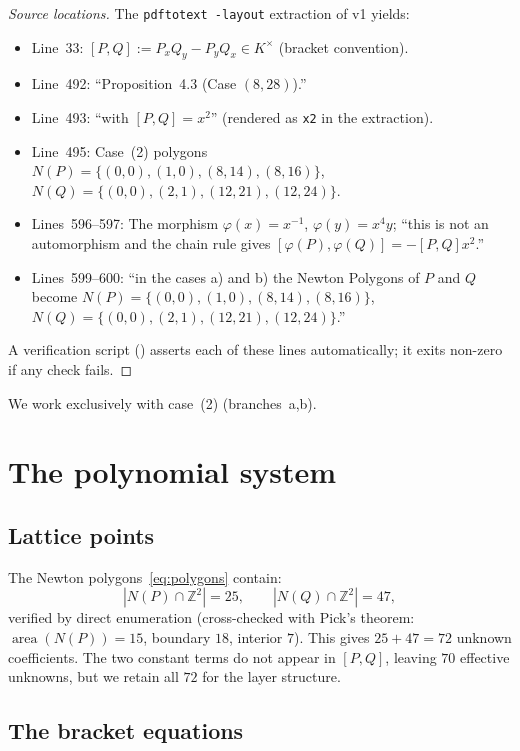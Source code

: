 \documentclass[a4paper,11pt]{article}
\newcommand{\filename}[1]{\texttt{\seqsplit{#1}}}
\theoremstyle{plain}
\theoremstyle{definition}
\theoremstyle{remark}
\begin{document}
\begin{proof}[Source locations]
The \texttt{pdftotext -layout} extraction of v1 yields:
\begin{itemize}[nosep]
\item Line~33: $[P,Q]:=P_xQ_y-P_yQ_x\in K^\times$ (bracket convention).
\item Line~492: ``Proposition~4.3 (Case $(8,28)$).''
\item Line~493: ``with $[P,Q]=x^2$'' (rendered as \texttt{x2} in the extraction).
\item Line~495: Case~(2) polygons\\
$N(P)=\{(0,0),(1,0),(8,14),(8,16)\}$, $N(Q)=\{(0,0),(2,1),(12,21),(12,24)\}$.
\item Lines~596--597: The morphism $\varphi(x)=x^{-1}$, $\varphi(y)=x^4y$; ``this is not an automorphism and the chain rule gives $[\varphi(P),\varphi(Q)]=-[P,Q]x^2$.''
\item Lines~599--600: ``in the cases a) and b) the Newton Polygons of $P$ and $Q$ become $N(P)=\{(0,0),(1,0),(8,14),(8,16)\}$, $N(Q)=\{(0,0),(2,1),(12,21),(12,24)\}$.''
\end{itemize}
A verification script (\filename{source\_gate\_verify.py}) asserts each of these lines automatically; it exits non-zero if any check fails.
\end{proof}

We work exclusively with case~(2) (branches~a,b).

\section{The polynomial system}\label{sec:system}

\subsection{Lattice points}

The Newton polygons~\eqref{eq:polygons} contain:
\begin{equation}
|N(P)\cap\mathbb{Z}^2|=25,\qquad |N(Q)\cap\mathbb{Z}^2|=47,
\end{equation}
verified by direct enumeration (cross-checked with Pick's theorem: $\operatorname{area}(N(P))=15$, boundary $18$, interior $7$). This gives $25+47=72$ unknown coefficients. The two constant terms do not appear in $[P,Q]$, leaving $70$ effective unknowns, but we retain all $72$ for the layer structure.

\subsection{The bracket equations}
\end{document}
